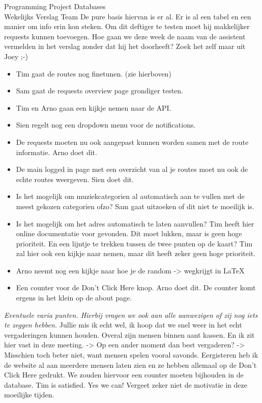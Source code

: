 \documentclass{article}
\newcounter{team}
\begin{document}
\begin{Minutes}{Programming Project Databases \\ Wekelijks Verslag Team }
				    De pure basis hiervan is er al. Er is al een tabel en een manier om info erin kon steken. Om dit deftiger te testen moet hij makkelijker requests kunnen toevoegen.
				    Hoe gaan we deze week de naam van de assistent vermelden in het verslag zonder dat hij het doorheeft? Zoek het zelf maar uit Joey ;-)
			\begin{itemize}
			    \item Tim gaat de routes nog finetunen. (zie hierboven)
			    \item Sam gaat de requests overview page grondiger testen.
			    \item Tim en Arno gaan een kijkje nemen naar de API.
			    \item Sien regelt nog een dropdown menu voor de notifications.
			    \item De requests moeten nu ook aangepast kunnen worden samen met de route informatie. Arno doet dit.
			    \item De main logged in page met een overzicht van al je routes moet nu ook de echte routes weergeven. Sien doet dit.
			    \item Is het mogelijk om muziekcategorien al automatisch aan te vullen met de meest gekozen categorien ofzo? Sam gaat uitzoeken of dit niet te moeilijk is.
			    \item Is het mogelijk om het adres automatisch te laten aanvullen? Tim heeft hier online documentatie voor gevonden. Dit moet lukken, maar is geen hoge prioriteit. En een lijntje te trekken tussen de twee punten op de kaart? Tim zal hier ook een kijkje naar nemen, maar dit heeft zeker geen hoge prioriteit.
			    \item Arno neemt nog een kijkje naar hoe je de random -> wegkrijgt in \LaTeX
			    \item Een counter voor de Don't Click Here knop. Arno doet dit. De counter komt ergens in het klein op de about page.
			\end{itemize}


			\emph{Eventuele varia punten. Hierbij vragen we ook aan alle aanwezigen of zij nog iets te zeggen hebben.}
				    Jullie mis ik echt wel, ik hoop dat we snel weer in het echt vergaderingen kunnen         houden.
				    Overal zijn mensen binnen aant kassen. En ik zit hier vast in deze meeting. -> Op een ander moment dan best vergaderen? -> Misschien toch beter niet, want mensen spelen vooral savonds.
				    Eergisteren heb ik de website al aan meerdere mensen laten zien en ze hebben allemaal op de Don't Click Here gedrukt. We zouden hiervoor een counter moeten bijhouden in de database. Tim is satisfied.
				    Yes we can! Vergeet zeker niet de motivatie in deze moeilijke tijden.



\end{Minutes}
\end{document}
